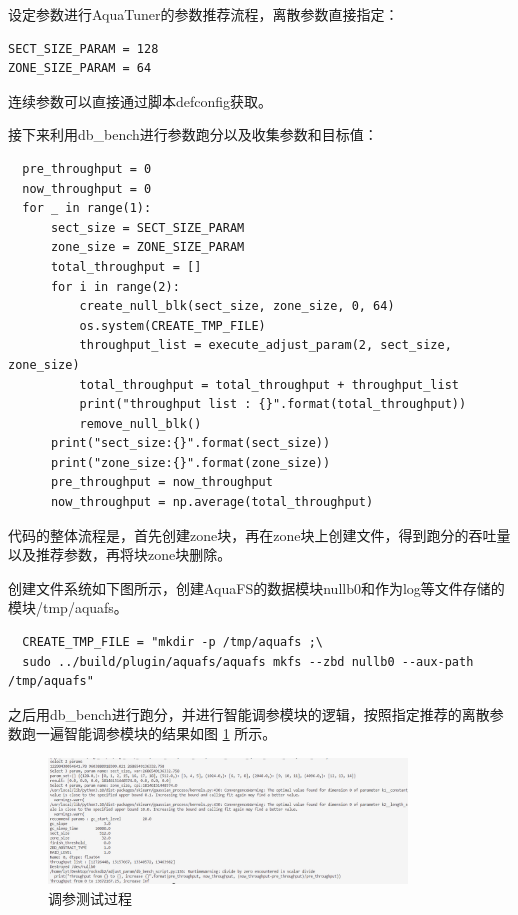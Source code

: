设定参数进行AquaTuner的参数推荐流程，离散参数直接指定：

\begin{lstlisting}
SECT_SIZE_PARAM = 128
ZONE_SIZE_PARAM = 64
\end{lstlisting}

连续参数可以直接通过脚本defconfig获取。

接下来利用db\_bench进行参数跑分以及收集参数和目标值：

\begin{lstlisting}
  pre_throughput = 0
  now_throughput = 0
  for _ in range(1):
      sect_size = SECT_SIZE_PARAM
      zone_size = ZONE_SIZE_PARAM
      total_throughput = []
      for i in range(2):
          create_null_blk(sect_size, zone_size, 0, 64)
          os.system(CREATE_TMP_FILE)
          throughput_list = execute_adjust_param(2, sect_size, zone_size)
          total_throughput = total_throughput + throughput_list
          print("throughput list : {}".format(total_throughput))
          remove_null_blk()
      print("sect_size:{}".format(sect_size))
      print("zone_size:{}".format(zone_size))
      pre_throughput = now_throughput
      now_throughput = np.average(total_throughput)
\end{lstlisting}

代码的整体流程是，首先创建zone块，再在zone块上创建文件，得到跑分的吞吐量以及推荐参数，再将块zone块删除。

创建文件系统如下图所示，创建AquaFS的数据模块nullb0和作为log等文件存储的模块/tmp/aquafs。

\begin{lstlisting}
  CREATE_TMP_FILE = "mkdir -p /tmp/aquafs ;\
  sudo ../build/plugin/aquafs/aquafs mkfs --zbd nullb0 --aux-path /tmp/aquafs"
\end{lstlisting}

之后用db\_bench进行跑分，并进行智能调参模块的逻辑，按照指定推荐的离散参数跑一遍智能调参模块的结果如图 \ref{test-turnner2} 所示。

\begin{figure}[htbp]
  \centering
  \includegraphics[width=0.85\textwidth]{fig/turnner2}
  \caption{ 调参测试过程 }
  \label{test-turnner2}
\end{figure}

